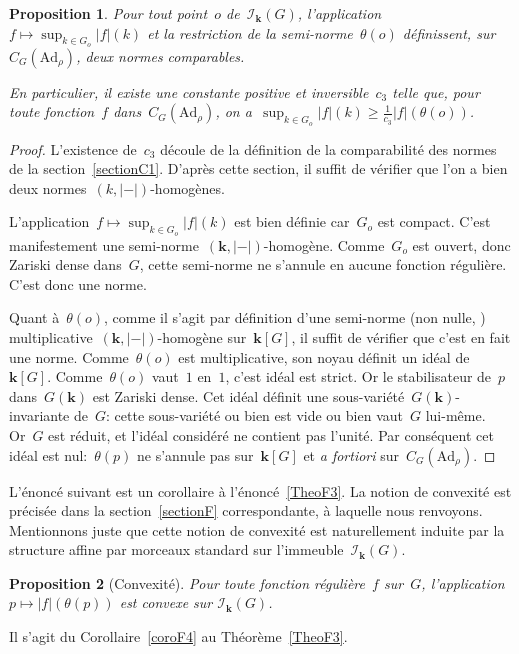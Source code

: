 \documentclass[french]{amsart}
\newcommand{\kk}{\mathbf{k}}
\newcommand{\abs}[1]{{\left|{#1}\right|}}
\newcommand{\Ik}{\mathscr{I}_\kk}
\newcommand{\Ad}{\mathrm{Ad}}
\newtheorem{proposition}{Proposition}[section]
\begin{document}
\begin{proposition}\label{prop35}\label{Prop35}
Pour tout point~$o$ de~$\Ik(G)$, l'application~$f\mapsto \sup_{k\in G_o}\abs{f}(k)$ et la restriction de la semi-norme~$\theta(o)$ définissent, sur~$C_G(\Ad_\rho)$, deux normes comparables.

En particulier, il existe une constante positive et inversible~$c_3$ telle que, pour toute fonction~$f$ dans~$C_G(\Ad_\rho)$, on a~$\sup_{k\in G_o}\abs{f}(k)\geq\frac{1}{c_3}\abs{f}(\theta(o))$.
\end{proposition}
\begin{proof}
L’existence de~$c_3$ découle de la définition de la comparabilité des nor\-mes de la section~\ref{sectionC1}. D’après cette section, il suffit de vérifier que l’on a
bien deux normes~$(k,\abs{-})$-homogènes.

L’application~$f \mapsto \sup_{k\in G_o}\abs{f}(k)$ est bien définie car~$G_o$ est compact. C’est manifestement
une semi-norme~$(\kk,\abs{-})$-homogène. Comme~$G_o$ est ouvert, donc Zariski dense dans~$G$,
cette semi-norme ne s’annule en aucune fonction régulière. C’est donc une norme.

Quant à~$\theta(o)$, comme il s’agit par définition d’une semi-norme (non nulle,
\cite[1.1]{Ber90}) multiplicative~$(\kk,\abs{-})$-homogène sur~$\kk[G]$, il suffit de vérifier que
c’est en fait une norme. Comme~$\theta(o)$ est multiplicative, son noyau définit un idéal
de~$\kk[G]$. Comme~$\theta(o)$ vaut~$1$ en~$1$, c’est idéal est strict. Or le stabilisateur de~$p$
dans~$G(\kk)$ est Zariski dense. Cet idéal définit une sous-variété~$G(\kk)$-invariante
de~$G$: cette sous-variété ou bien est vide ou bien vaut~$G$ lui-même. Or~$G$ est réduit,
et l’idéal considéré ne contient pas l’unité. Par conséquent cet idéal est nul:~$\theta(p)$
ne s’annule pas sur~$\kk[G]$ et \emph{a fortiori} sur~$C_G(\Ad_\rho)$.
\end{proof}
L'énoncé suivant est un corollaire à l’énoncé~\ref{TheoF3}. La notion de convexité est précisée dans la section~\ref{sectionF} correspondante, à laquelle nous renvoyons. Mentionnons juste que cette notion de convexité est naturellement induite par la structure affine par morceaux standard sur l'immeuble~$\Ik(G)$.
\begin{proposition}[Convexité]\label{prop36}\label{Prop36}
Pour toute fonction régulière~$f$ sur~$G$,
l'application~$p \mapsto \abs{f}(\theta(p))$ est convexe sur $\Ik (G)$.
\end{proposition}
Il s'agit du Corollaire~\ref{coroF4} au Théorème~\ref{TheoF3}.
\end{document}
